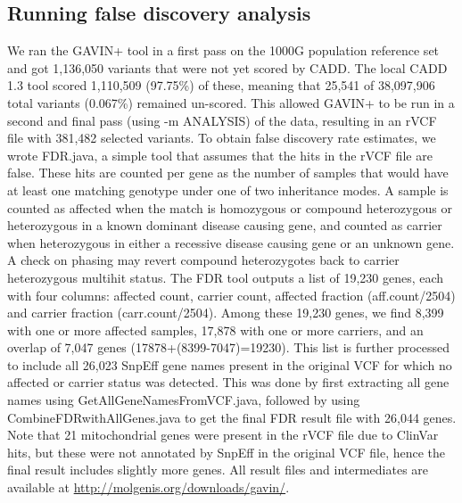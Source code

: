\subsection{Running false discovery analysis}
We ran the GAVIN+ tool in a first pass on the 1000G population reference set and got 1,136,050 variants that were not yet scored by CADD.
The local CADD 1.3 tool scored 1,110,509 (97.75\%) of these, meaning that 25,541 of 38,097,906 total variants (0.067\%) remained un-scored.
This allowed GAVIN+ to be run in a second and final pass (using -m ANALYSIS) of the data, resulting in an rVCF file with 381,482 selected variants.
To obtain false discovery rate estimates, we wrote FDR.java, a simple tool that assumes that the hits in the rVCF file are false.
These hits are counted per gene as the number of samples that would have at least one matching genotype under one of two inheritance modes.
A sample is counted as affected when the match is homozygous or compound heterozygous or heterozygous in a known dominant disease causing gene, and counted as carrier when heterozygous in either a recessive disease causing gene or an unknown gene.
A check on phasing may revert compound heterozygotes back to carrier heterozygous multihit status.
The FDR tool outputs a list of 19,230 genes, each with four columns: affected count, carrier count, affected fraction (aff.count/2504) and carrier fraction (carr.count/2504).
Among these 19,230 genes, we find 8,399 with one or more affected samples, 17,878 with one or more carriers, and an overlap of 7,047 genes (17878+(8399-7047)=19230).
This list is further processed to include all 26,023 SnpEff gene names present in the original VCF for which no affected or carrier status was detected.
This was done by first extracting all gene names using GetAllGeneNamesFromVCF.java, followed by using CombineFDRwithAllGenes.java to get the final FDR result file with 26,044 genes.
Note that 21 mitochondrial genes were present in the rVCF file due to ClinVar hits, but these were not annotated by SnpEff in the original VCF file, hence the final result includes slightly more genes.
All result files and intermediates are available at \url{http://molgenis.org/downloads/gavin/}.

